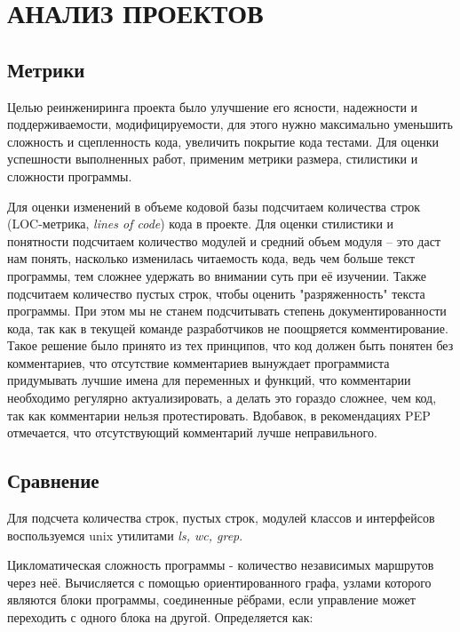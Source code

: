 \section{АНАЛИЗ ПРОЕКТОВ}
    \subsection{Метрики}
    Целью реинжениринга проекта было улучшение его ясности, надежности и поддерживаемости,
    модифицируемости, для этого нужно максимально уменьшить сложность и сцепленность кода,
    увеличить покрытие кода тестами.
    Для оценки успешности выполненных работ, применим метрики размера,
    стилистики и сложности программы.
    \cite{metrics.cmcons}

    Для оценки изменений в объеме кодовой базы подсчитаем количества строк
    (LOC-метрика, \textit{lines of code}) кода в проекте.
    Для оценки стилистики и понятности подсчитаем количество модулей и средний
    объем модуля -- это даст нам понять, насколько изменилась читаемость кода,
    ведь чем больше текст программы, тем сложнее удержать во внимании суть при её
    изучении. Также подсчитаем количество пустых строк, чтобы оценить
    "разряженность" текста программы.
    При этом мы не станем подсчитывать степень документированности кода,
    так как в текущей команде разработчиков не поощряется комментирование.
    Такое решение было принято из тех принципов,
    что код должен быть понятен без комментариев,
    что отсутствие комментариев вынуждает программиста придумывать лучшие имена
    для переменных и функций,
    что комментарии необходимо регулярно актуализировать, а делать это
    гораздо сложнее, чем код, так как комментарии нельзя протестировать.
    Вдобавок, в рекомендациях PEP отмечается, что отсутствующий комментарий лучше неправильного.

    \subsection{Сравнение}
    Для подсчета количества строк, пустых строк, модулей классов и интерфейсов
    воспользуемся unix утилитами \textit{ls, wc, grep}.

    Цикломатическая сложность программы - количество независимых маршрутов через
    неё. Вычисляется с помощью ориентированного графа, узлами которого являются
    блоки программы, соединенные рёбрами, если управление может переходить с
    одного блока на другой. Определяется как: \cite{complexity.McCabe}


